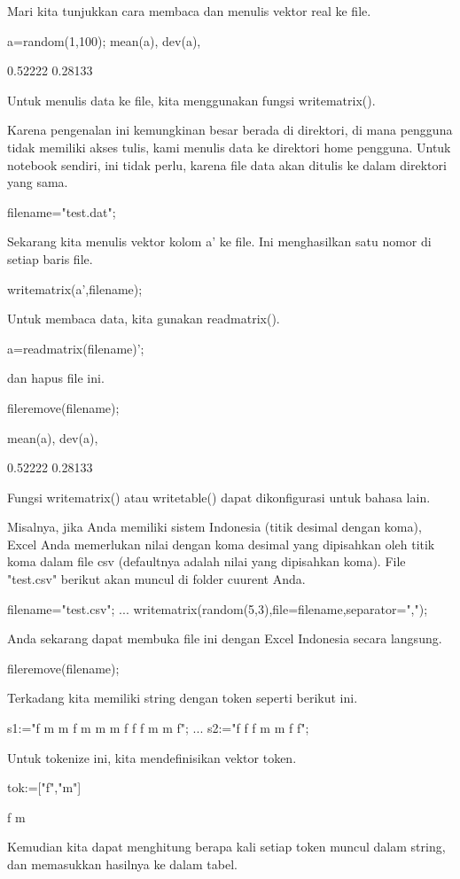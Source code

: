 \documentclass{article}
\begin{document}
Mari kita tunjukkan cara membaca dan menulis vektor real ke file.


\>a=random(1,100); mean(a), dev(a),


    0.52222
    0.28133

Untuk menulis data ke file, kita menggunakan fungsi writematrix().


Karena pengenalan ini kemungkinan besar berada di direktori, di mana
pengguna tidak memiliki akses tulis, kami menulis data ke direktori
home pengguna. Untuk notebook sendiri, ini tidak perlu, karena file
data akan ditulis ke dalam direktori yang sama.


\>filename="test.dat";


Sekarang kita menulis vektor kolom a' ke file. Ini menghasilkan satu
nomor di setiap baris file.


\>writematrix(a',filename);


Untuk membaca data, kita gunakan readmatrix().


\>a=readmatrix(filename)';


dan hapus file ini.


\>fileremove(filename);

\>mean(a), dev(a),


    0.52222
    0.28133

Fungsi writematrix() atau writetable() dapat dikonfigurasi untuk
bahasa lain.


Misalnya, jika Anda memiliki sistem Indonesia (titik desimal dengan
koma), Excel Anda memerlukan nilai dengan koma desimal yang dipisahkan
oleh titik koma dalam file csv (defaultnya adalah nilai yang
dipisahkan koma). File "test.csv" berikut akan muncul di folder
cuurent Anda.


\>filename="test.csv"; ...  
\>   writematrix(random(5,3),file=filename,separator=",");


Anda sekarang dapat membuka file ini dengan Excel Indonesia secara
langsung.


\>fileremove(filename);


Terkadang kita memiliki string dengan token seperti berikut ini.


\>s1:="f m m f m m m f f f m m f";  ...  
\>   s2:="f f f m m f f";


Untuk tokenize ini, kita mendefinisikan vektor token.


\>tok:=["f","m"]


    f
    m

Kemudian kita dapat menghitung berapa kali setiap token muncul dalam
string, dan memasukkan hasilnya ke dalam tabel.
\end{document}
